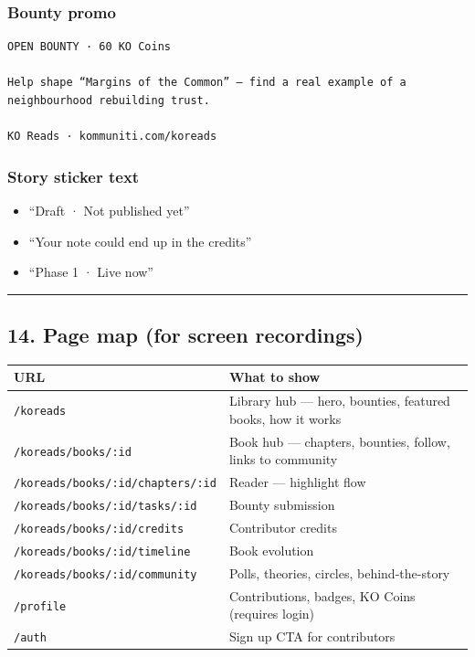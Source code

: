\documentclass[11pt,a4paper]{report}
\begin{document}
\subsubsection{Bounty promo}
\begin{verbatim}
OPEN BOUNTY · 60 KO Coins

Help shape “Margins of the Common” — find a real example of a neighbourhood rebuilding trust.

KO Reads · kommuniti.com/koreads
\end{verbatim}

\subsubsection{Story sticker text}
\begin{itemize}
  \item “Draft · Not published yet”
  \item “Your note could end up in the credits”
  \item “Phase 1 · Live now”
\end{itemize}

\medskip\hrule\medskip

\subsection{14. Page map (for screen recordings)}

\begin{longtable}{|l|l|}
\hline
URL & What to show \\ \hline
\texttt{/koreads} & Library hub --- hero, bounties, featured books, how it works \\ \hline
\texttt{/koreads/books/:id} & Book hub --- chapters, bounties, follow, links to community \\ \hline
\texttt{/koreads/books/:id/chapters/:id} & Reader --- highlight flow \\ \hline
\texttt{/koreads/books/:id/tasks/:id} & Bounty submission \\ \hline
\texttt{/koreads/books/:id/credits} & Contributor credits \\ \hline
\texttt{/koreads/books/:id/timeline} & Book evolution \\ \hline
\texttt{/koreads/books/:id/community} & Polls, theories, circles, behind-the-story \\ \hline
\texttt{/profile} & Contributions, badges, KO Coins (requires login) \\ \hline
\texttt{/auth} & Sign up CTA for contributors \\
\hline
\end{longtable}
\end{document}

